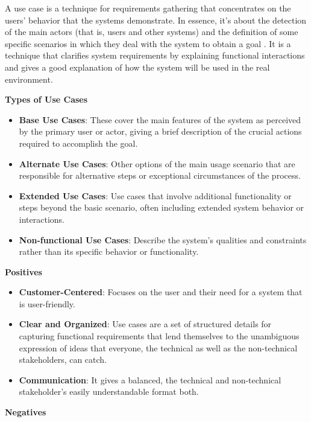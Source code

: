 \documentclass[conference]{IEEEtran}
\begin{document}
A use case is a technique for requirements gathering that concentrates on the users' behavior that the systems demonstrate. In essence, it's about the detection of the main actors (that is, users and other systems) and the definition of some specific scenarios in which they deal with the system to obtain a goal \cite{cite12}. It is a technique that clarifies system requirements by explaining functional interactions and gives a good explanation of how the system will be used in the real environment.

\textbf{Types of Use Cases}

\begin{itemize}
    \item \textbf{Base Use Cases}: These cover the main features of the system as perceived by the primary user or actor, giving a brief description of the crucial actions required to accomplish the goal.
    \item \textbf{Alternate Use Cases}: Other options of the main usage scenario that are responsible for alternative steps or exceptional circumstances of the process.
    \item \textbf{Extended Use Cases}: Use cases that involve additional functionality or steps beyond the basic scenario, often including extended system behavior or interactions.
    \item \textbf{Non-functional Use Cases}: Describe the system's qualities and constraints rather than its specific behavior or functionality.
\end{itemize}

\textbf{Positives}

\begin{itemize}
    \item \textbf{Customer-Centered}: Focuses on the user and their need for a system that is user-friendly.
    \item \textbf{Clear and Organized}: Use cases are a set of structured details for capturing functional requirements that lend themselves to the unambiguous expression of ideas that everyone, the technical as well as the non-technical stakeholders, can catch.
    \item \textbf{Communication}: It gives a balanced, the technical and non-technical stakeholder's easily understandable format both.
\end{itemize}

\textbf{Negatives}
\end{document}
